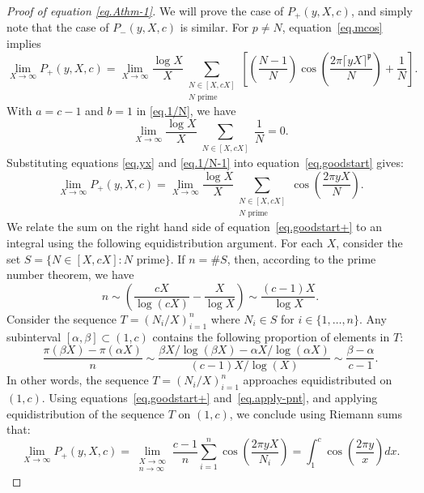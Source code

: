 \documentclass{amsart}
\theoremstyle{definition}
\newcommand{\prceil}{\rceil^{\mathfrak p}}
\numberwithin{equation}{section}
\begin{document}
\begin{proof}[Proof of equation \eqref{eq.Athm-1}]
We will prove the case of $P_+(y,X,c)$, and simply note that the case of $P_- (y, X, c)$ is similar.
For $p\neq N$, equation~\eqref{eq.mcos} implies
\begin{equation}\label{eq.goodstart}
\lim_{X\to \infty} P_+ (y, X, c) = \lim_{X \to \infty} \frac{\log X}{X}\sum_{\substack{N \in [X, cX] \\ N \text{ prime}}} \left [ \left( \frac{N-1}{N}\right)\cos\left(\frac{2 \pi \lceil yX \prceil}{N} \right) + \frac 1 N \right ].  
\end{equation}
With $a=c-1$ and $b=1$ in \eqref{eq.1/N}, we have \begin{equation}\label{eq.1/N-1}   \lim_{X \to \infty} \frac{\log X}{X}\sum_{\substack{N \in [X, cX]}}  \frac 1 N  =0. \end{equation}
Substituting equations \eqref{eq.yx} and \eqref{eq.1/N-1} into equation~\eqref{eq.goodstart} gives:
\begin{equation}\label{eq.goodstart+}
\lim_{X\to \infty} P_+ (y, X, c) =\lim_{X \to \infty} \frac{\log X}{X}\sum_{\substack{N \in [X, cX] \\ N \text{ prime}}}\cos\left(\frac{2 \pi yX}{N} \right).
\end{equation}
We relate the sum on the right hand side of equation~\eqref{eq.goodstart+} to an integral using the following equidistribution argument.
For each $X$, consider the set $S=\{N \in [X, cX] : N \text{ prime}\}$.
If $n=\#S$, then, according to the prime number theorem, we have
\begin{equation}\label{eq.apply-pnt}
n \sim \left ( \frac {cX}{\log(cX)} - \frac X {\log X} \right )\sim \frac {(c-1) X}{\log X}.
\end{equation} 
Consider the sequence $T=(N_i/X)_{i=1}^n$ where $N_i\in S$ for $i\in\{1,\dots,n\}$.
Any subinterval $[\alpha,\beta]\subset(1,c)$ contains the following proportion of elements in $T$:
\[\frac{\pi(\beta X)-\pi(\alpha X)}{n}\sim\frac{\beta X/\log(\beta X)-\alpha X/\log(\alpha X)}{(c-1)X/\log(X)}\sim\frac{\beta-\alpha}{c-1}.\]
In other words, the sequence $T=(N_i/X)_{i=1}^n$ approaches equidistributed on $(1,c)$.
Using equations~\eqref{eq.goodstart+} and~\eqref{eq.apply-pnt}, and applying equidistribution of the sequence $T$ on $(1,c)$, we  conclude using Riemann sums that:
\begin{equation}
\lim_{X\to \infty} P_+ (y, X, c)
    = \lim_{\substack{X \to \infty \\ n \to \infty}} \frac{c-1}{n} \sum_{i=1}^n \cos\left(\frac{2 \pi y X}{N_i} \right) =\int_1^c \cos\left(\frac{2 \pi y}{x}\right)dx.
\end{equation}
\end{proof}
\end{document}
